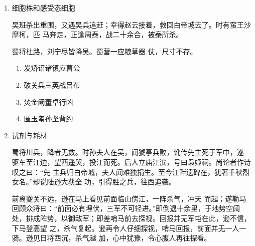 \documentclass[UTF8,12pt,twoside,a4paper]{ctexart} %
\begin{document}
\begin{flushleft}
\begin{enumerate}
\heiti {} \item  细胞株和感受态细胞

\songti {}
\indent\setlength{\parindent}{2em}%
吴班杀出重围，又遇吴兵追赶；幸得赵云接着，救回白帝城去了。时有蛮王沙摩柯，匹
马奔走，正逢周泰，战二十余合，被泰所杀。

蜀将杜路，刘宁尽皆降吴。蜀营一应粮草器
仗，尺寸不存。

	\begin{enumerate}[(1)] %
\songti
\item  	发矫诏诸镇应曹公 
\item  破关兵三英战吕布
\item    	焚金阙董卓行凶 
\item  匿玉玺孙坚背约
	\end{enumerate}



\heiti {} \item  试剂与耗材

\songti {}
\indent\setlength{\parindent}{2em}%
蜀将川兵，降者无数。时孙夫人在吴，闻猇亭兵败，讹传先主死于军中，遂
驱车至江边，望西遥哭，投江而死。后人立庙江滨，号曰枭姬祠。尚论者作诗叹之曰：“先
主兵归白帝城，夫人闻难独捐生。至今江畔遗碑在，犹著千秋烈女名。”却说陆逊大获全
功，引得胜之兵，往西追袭。

前离夔关不远，逊在马上看见前面临山傍江，一阵杀气，冲天
而起；遂勒马回顾众将曰：“前面必有埋伏，三军不可轻进。”即倒退十余里，于地势空阔
处，排成阵势，以御敌军；即差哨马前去探视。回报并无军屯在此，逊不信，下马登高望
之，杀气复起。逊再令人仔细探视，哨马回报，前面并无一人一骑。逊见日将西沉，杀气越
加，心中犹豫，令心腹人再往探看。

\end{enumerate}


\end{flushleft}%

\end{document}
